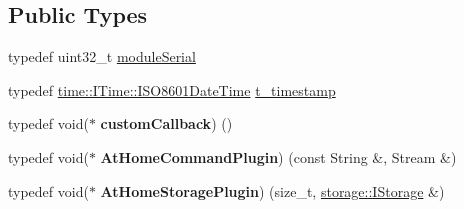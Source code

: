 \subsection*{Public Types}
\begin{DoxyCompactItemize}
\item 
typedef uint32\+\_\+t \mbox{\hyperlink{classathome_1_1module_1_1_at_home_module_aaa31c8eddb689010ef59deba4e1463c6}{module\+Serial}}
\item 
typedef \mbox{\hyperlink{structathome_1_1time_1_1_i_time_1_1_i_s_o8601_date_time}{time\+::\+I\+Time\+::\+I\+S\+O8601\+Date\+Time}} \mbox{\hyperlink{classathome_1_1module_1_1_at_home_module_a077afdad789e433d59c588ec6c0f4594}{t\+\_\+timestamp}}
\item 
\mbox{\label{classathome_1_1module_1_1_at_home_module_a4ae49e9e7d0e5f4e9f9148ef76a288dd}} 
typedef void($\ast$ {\bfseries custom\+Callback}) ()
\item 
\mbox{\label{classathome_1_1module_1_1_at_home_module_a46fbde0e1376feef862e5cf5ca7b2570}} 
typedef void($\ast$ {\bfseries At\+Home\+Command\+Plugin}) (const String \&, Stream \&)
\item 
\mbox{\label{classathome_1_1module_1_1_at_home_module_a5c269b52c37b8ad6cb73f1607aecb0db}} 
typedef void($\ast$ {\bfseries At\+Home\+Storage\+Plugin}) (size\+\_\+t, \mbox{\hyperlink{classathome_1_1storage_1_1_i_storage}{storage\+::\+I\+Storage}} \&)
\end{DoxyCompactItemize}
